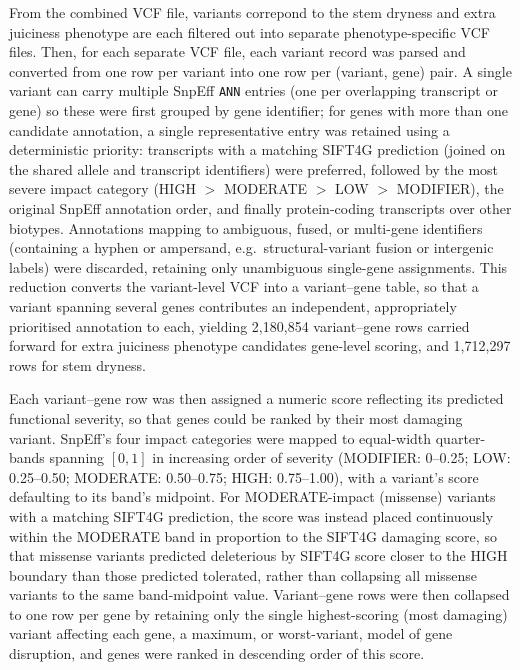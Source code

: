 \hspace{1em}From the combined VCF file, variants correpond to the stem dryness and extra juiciness phenotype are each filtered out into separate phenotype-specific VCF files. Then, for each separate VCF file, each variant record was parsed and converted from one row per variant into one row per (variant, gene) pair. A single variant can carry multiple SnpEff \texttt{ANN} entries (one per overlapping transcript or gene) so these were first grouped by gene identifier; for genes with more than one candidate annotation, a single representative entry was retained using a deterministic priority: transcripts with a matching SIFT4G prediction (joined on the shared allele and transcript identifiers) were preferred, followed by the most severe impact category (HIGH $>$ MODERATE $>$ LOW $>$ MODIFIER), the original SnpEff annotation order, and finally protein-coding transcripts over other biotypes. Annotations mapping to ambiguous, fused, or multi-gene identifiers (containing a hyphen or ampersand, e.g.\ structural-variant fusion or intergenic labels) were discarded, retaining only unambiguous single-gene assignments. This reduction converts the variant-level VCF into a variant--gene table, so that a variant spanning several genes contributes an independent, appropriately prioritised annotation to each, yielding 2,180,854 variant--gene rows carried forward for extra juiciness phenotype candidates gene-level scoring, and 1,712,297 rows for stem dryness.

\hspace{1em}Each variant--gene row was then assigned a numeric score reflecting its predicted functional severity, so that genes could be ranked by their most damaging variant. SnpEff's four impact categories were mapped to equal-width quarter-bands spanning $[0,1]$ in increasing order of severity (MODIFIER: 0--0.25; LOW: 0.25--0.50; MODERATE: 0.50--0.75; HIGH: 0.75--1.00), with a variant's score defaulting to its band's midpoint. For MODERATE-impact (missense) variants with a matching SIFT4G prediction, the score was instead placed continuously within the MODERATE band in proportion to the SIFT4G damaging score, so that missense variants predicted deleterious by SIFT4G score closer to the HIGH boundary than those predicted tolerated, rather than collapsing all missense variants to the same band-midpoint value. Variant--gene rows were then collapsed to one row per gene by retaining only the single highest-scoring (most damaging) variant affecting each gene, a maximum, or worst-variant, model of gene disruption, and genes were ranked in descending order of this score.

